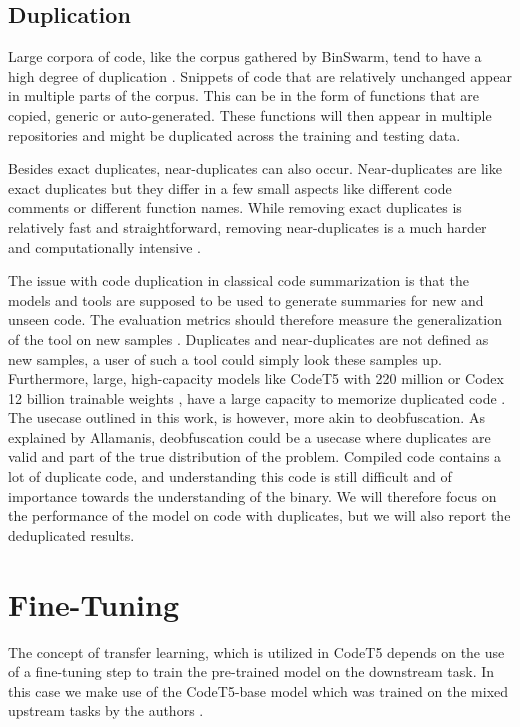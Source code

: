 \subsection{Duplication}
Large corpora of code, like the corpus gathered by BinSwarm, tend to have a high degree of duplication \cite{leclair_recommendations}. Snippets of code that are relatively unchanged appear in multiple parts of the corpus. This can be in the form of functions that are copied, generic or auto-generated. These functions will then appear in multiple repositories and might be duplicated across the training and testing data.

Besides exact duplicates, near-duplicates can also occur. Near-duplicates are like exact duplicates but they differ in a few small aspects like different code comments or different function names. While removing exact duplicates is relatively fast and straightforward, removing near-duplicates is a much harder and computationally intensive \cite{allamanis_adverse}. 

The issue with code duplication in classical code summarization is that the models and tools are supposed to be used to generate summaries for new and unseen code. The evaluation metrics should therefore measure the generalization of the tool on new samples \cite{allamanis_adverse}. Duplicates and near-duplicates are not defined as new samples, a user of such a tool could simply look these samples up. Furthermore, large, high-capacity models like CodeT5 with 220 million or Codex 12 billion \cite{CodeX} trainable weights \cite{CodeT5}, have a large capacity to memorize duplicated code \cite{allamanis_adverse}.
The usecase outlined in this work, is however, more akin to deobfuscation. As explained by Allamanis, deobfuscation could be a usecase where duplicates are valid and part of the true distribution of the problem\cite{allamanis_adverse}. Compiled code contains a lot of duplicate code, and understanding this code is still difficult and of importance towards the understanding of the binary. We will therefore focus on the performance of the model on code with duplicates, but we will also report the deduplicated results.

\section{Fine-Tuning}
The concept of transfer learning, which is utilized in CodeT5 depends on the use of a fine-tuning step to train the pre-trained model on the downstream task. In this case we make use of the CodeT5-base model which was trained on the mixed upstream tasks by the authors \cite{CodeT5}.

